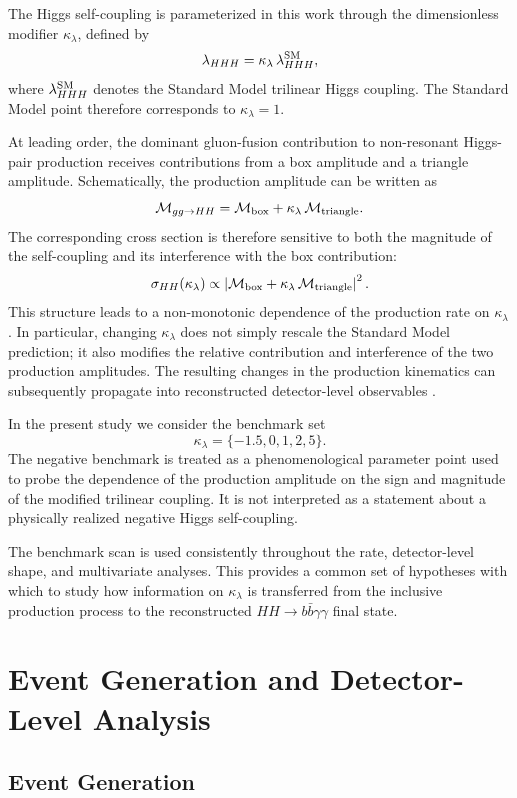 \documentclass[11pt,a4paper]{article}
\begin{document}
The Higgs self-coupling is parameterized in this work through the dimensionless modifier
$\kappa_\lambda$, defined by
\[
\lambda_{HHH}=\kappa_\lambda\,\lambda_{HHH}^{\rm SM},
\]
where $\lambda_{HHH}^{\rm SM}$ denotes the Standard Model trilinear Higgs coupling. The Standard Model point therefore corresponds to $\kappa_\lambda=1$.

At leading order, the dominant gluon-fusion contribution to non-resonant Higgs-pair production receives contributions from a box amplitude and a triangle amplitude. Schematically, the production amplitude can be written as
\[
\mathcal{M}_{gg\to HH}
=
\mathcal{M}_{\rm box}
+
\kappa_\lambda\,\mathcal{M}_{\rm triangle}.
\]
The corresponding cross section is therefore sensitive to both the magnitude of the self-coupling and its interference with the box contribution:
\[
\sigma_{HH}(\kappa_\lambda)
\propto
\left|
\mathcal{M}_{\rm box}
+
\kappa_\lambda\,\mathcal{M}_{\rm triangle}
\right|^2.
\]
This structure leads to a non-monotonic dependence of the production rate on $\kappa_\lambda$. In particular, changing $\kappa_\lambda$ does not simply rescale the Standard Model prediction; it also modifies the relative contribution and interference of the two production amplitudes. The resulting changes in the production kinematics can subsequently propagate into reconstructed detector-level observables \cite{Goncalves2018}.

In the present study we consider the benchmark set
\[
\kappa_\lambda=\{-1.5,0,1,2,5\}.
\]
The negative benchmark is treated as a phenomenological parameter point used to probe the dependence of the production amplitude on the sign and magnitude of the modified trilinear coupling. It is not interpreted as a statement about a physically realized negative Higgs self-coupling.

The benchmark scan is used consistently throughout the rate, detector-level shape, and multivariate analyses. This provides a common set of hypotheses with which to study how information on $\kappa_\lambda$ is transferred from the inclusive production process to the reconstructed $HH\to b\bar b\gamma\gamma$ final state.


\section{Event Generation and Detector-Level Analysis}

\subsection{Event Generation}
\end{document}
